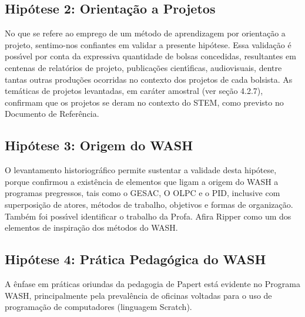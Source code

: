 \documentclass[
12pt,		%
openright,	%
twoside,  %
a4paper,			%
chapter=TITLE,		%
english,			%
french,				%
spanish,			%
brazil				%
]{USPSC-classe/USPSC}
\begin{document}
\subsection[Hip\'otese 2: Orienta\c{c}\~ao a Projetos]{Hip\'otese 2: Orienta\c{c}\~ao a Projetos}\label{Hip\'otese 2: Orienta\c{c}\~ao a Projetos}
No que se refere ao emprego de um m\'etodo de aprendizagem por \textquotedbl orienta\c{c}\~ao a projeto\textquotedbl , sentimo-nos confiantes em validar a presente hip\'otese. Essa valida\c{c}\~ao \'e poss\'{\i}vel por conta da expressiva quantidade de bolsas concedidas, resultantes em centenas de relat\'orios de projeto, publica\c{c}\~oes cient\'{\i}ficas, audiovisuais, dentre tantas outras produ\c{c}\~oes ocorridas no contexto dos projetos de cada bolsista. As tem\'aticas de projetos levantadas, em car\'ater amostral (ver se\c{c}\~ao 4.2.7), confirmam que os projetos se deram no contexto do STEM, como previsto no Documento de Refer\^encia.









\subsection[Hip\'otese 3: Origem do WASH]{Hip\'otese 3: Origem do WASH}\label{Hip\'otese 3: Origem do WASH}
O levantamento historiogr\'afico permite sustentar a validade desta hip\'otese, porque confirmou a exist\^encia de elementos que ligam a origem do WASH a programas pregressos, tais como o GESAC, O OLPC e o PID, inclusive com superposi\c{c}\~ao de atores, m\'etodos de trabalho, objetivos e formas de organiza\c{c}\~ao. Tamb\'em foi poss\'{\i}vel identificar o trabalho da Profa. Afira Ripper como um dos elementos de inspira\c{c}\~ao dos m\'etodos do WASH.









\subsection[Hip\'otese 4: Pr\'atica Pedag\'ogica do WASH]{Hip\'otese 4: Pr\'atica Pedag\'ogica do WASH}\label{Hip\'otese 4: Pr\'atica Pedag\'ogica do WASH}
A \^enfase em pr\'aticas oriundas da pedagogia de Papert est\'a evidente no Programa WASH, principalmente pela preval\^encia de oficinas voltadas para o uso de programa\c{c}\~ao de computadores (linguagem Scratch).
\end{document}
